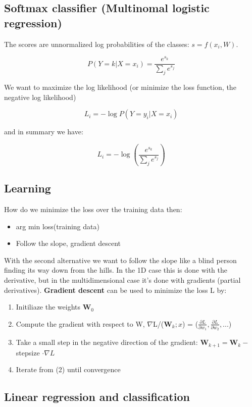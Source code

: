 \subsection*{Softmax classifier (Multinomal logistic regression)}
The scores are unnormalized log probabilities of the classes: $s = f(x_i,W)$.

	\begin{equation}
		P(Y=k | X = x_i) = \frac{e^{s_k}} {\sum_{j}^{} e^{s_j}} 
	\end{equation}

We want to maximize the log likelihood (or minimize the loss function, the negative log likelihood)


	\begin{equation}
		L_i = -\log P(Y=y_i | X = x_i)
	\end{equation}

and in summary we have:

	\begin{equation}
		L_i = - \log (\frac{e^{s_k}} {\sum_{j}^{} e^{s_j}} ) 
	\end{equation}


\subsection*{Learning}

How do we minimize the loss over the training data then: 

\begin{itemize}
	\item arg min loss(training data) 
	\item Follow the slope, gradient descent
\end{itemize}


With the second alternative we want to follow the slope like a blind person finding its way down from the hills. In the 1D case this is done with the derivative, but in the multidimensional case it's done with gradients (partial derivatives). \textbf{Gradient descent} can be used to minimize the loss L by:

\begin{enumerate}
	\item Initiliaze the weights $\textbf{W}_0$
	\item Compute the gradient with respect to W, $\nabla$L/($\textbf{W}_k;x$) = ($ \frac{\partial L} {\partial w_1}, \frac{\partial L} {\partial w_2}, ...$)
	\item Take a small step in the negative direction of the gradient: $\textbf{W}_{k+1} = \textbf{W}_k-$ stepsize $\cdot \nabla L$
	\item Iterate from (2) until convergence
\end{enumerate}

\subsection*{Linear regression and classification}











